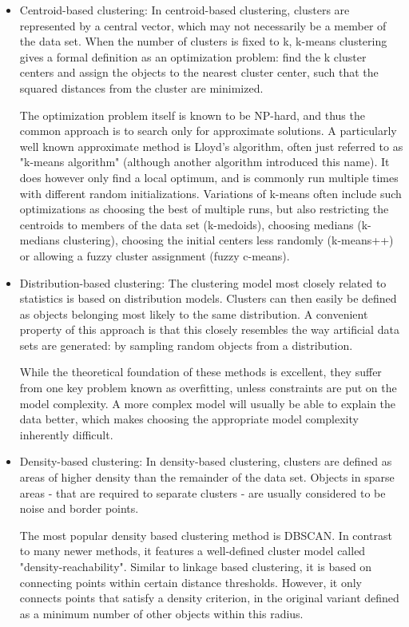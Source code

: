\documentclass[12pt]{report}	%
\begin{document}
\begin{itemize}
	
	\item Centroid-based clustering:
	In centroid-based clustering, clusters are represented by a central vector, which may not necessarily be a member of the data set. When the number of clusters is fixed to k, k-means clustering gives a formal definition as an optimization problem: find the k cluster centers and assign the objects to the nearest cluster center, such that the squared distances from the cluster are minimized.

    The optimization problem itself is known to be NP-hard, and thus the common approach is to search only for approximate solutions. A particularly well known approximate method is Lloyd's algorithm, often just referred to as "k-means algorithm" (although another algorithm introduced this name). It does however only find a local optimum, and is commonly run multiple times with different random initializations. Variations of k-means often include such optimizations as choosing the best of multiple runs, but also restricting the centroids to members of the data set (k-medoids), choosing medians (k-medians clustering), choosing the initial centers less randomly (k-means++) or allowing a fuzzy cluster assignment (fuzzy c-means).
    
	\item Distribution-based clustering:
	The clustering model most closely related to statistics is based on distribution models. Clusters can then easily be defined as objects belonging most likely to the same distribution. A convenient property of this approach is that this closely resembles the way artificial data sets are generated: by sampling random objects from a distribution.

    While the theoretical foundation of these methods is excellent, they suffer from one key problem known as overfitting, unless constraints are put on the model complexity. A more complex model will usually be able to explain the data better, which makes choosing the appropriate model complexity inherently difficult.

	\item Density-based clustering:
	In density-based clustering, clusters are defined as areas of higher density than the remainder of the data set. Objects in sparse areas - that are required to separate clusters - are usually considered to be noise and border points.

    The most popular density based clustering method is DBSCAN. In contrast to many newer methods, it features a well-defined cluster model called "density-reachability". Similar to linkage based clustering, it is based on connecting points within certain distance thresholds. However, it only connects points that satisfy a density criterion, in the original variant defined as a minimum number of other objects within this radius. 
    

\end{itemize}
\end{document}

